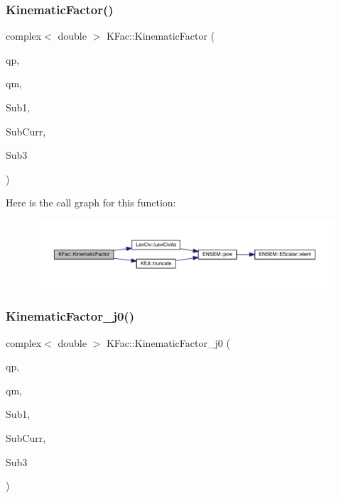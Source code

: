 \subsubsection{\texorpdfstring{KinematicFactor()}{KinematicFactor()}}
{\footnotesize\ttfamily complex$<$ double $>$ K\+Fac\+::\+Kinematic\+Factor (\begin{DoxyParamCaption}\item[{Eigen\+::\+Vector\+Xd \&}]{qp,  }\item[{Eigen\+::\+Vector\+Xd \&}]{qm,  }\item[{Eigen\+::\+Matrix\+Xcd \&}]{Sub1,  }\item[{Eigen\+::\+Matrix\+Xcd \&}]{Sub\+Curr,  }\item[{Eigen\+::\+Matrix\+Xcd \&}]{Sub3 }\end{DoxyParamCaption})}

Here is the call graph for this function\+:
\nopagebreak
\begin{figure}[H]
\begin{center}
\leavevmode
\includegraphics[width=350pt]{d2/d89/namespaceKFac_a56130e258872427e83c530a5a471cf5c_cgraph}
\end{center}
\end{figure}
\mbox{\label{namespaceKFac_a6f8f443ade2532c958e4dc168d7da1c7}} 
\subsubsection{\texorpdfstring{KinematicFactor\_j0()}{KinematicFactor\_j0()}}
{\footnotesize\ttfamily complex$<$ double $>$ K\+Fac\+::\+Kinematic\+Factor\+\_\+j0 (\begin{DoxyParamCaption}\item[{Eigen\+::\+Vector\+Xd \&}]{qp,  }\item[{Eigen\+::\+Vector\+Xd \&}]{qm,  }\item[{Eigen\+::\+Matrix\+Xcd \&}]{Sub1,  }\item[{Eigen\+::\+Matrix\+Xcd \&}]{Sub\+Curr,  }\item[{Eigen\+::\+Matrix\+Xcd \&}]{Sub3 }\end{DoxyParamCaption})}

